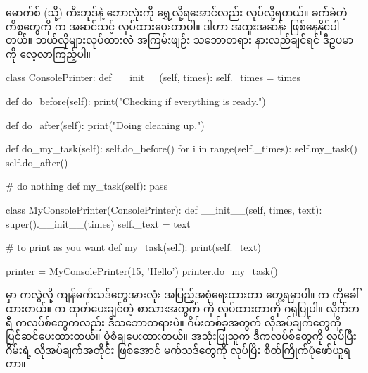 မောက်စ် (သို့) ကီးဘုဒ်နဲ့ ဘောလုံးကို ရွှေ့လို့ရအောင်လည်း လုပ်လို့ရတယ်။ ခက်ခဲတဲ့ ကိစ္စတွေကို  က အဆင်သင့် လုပ်ထားပေးတာပါ။ ဒါဟာ အထူးအဆန်း ဖြစ်နေနိုင်ပါတယ်။ ဘယ်လိုများလုပ်ထားလဲ အကြမ်းဖျဉ်း သဘောတရား နားလည်ချင်ရင် ဒီဥပမာကို လေ့လာကြည့်ပါ။ 
%
\begin{py}
class ConsolePrinter:
    def __init__(self, times):
        self._times = times
        
    def do_before(self):
        print("Checking if everything is ready.")
        
    def do_after(self):
        print("Doing cleaning up.")

    def do_my_task(self):
        self.do_before()
        for i in range(self._times):
            self.my_task()
        self.do_after()

    # do nothing    
    def my_task(self):
        pass


class MyConsolePrinter(ConsolePrinter):
    def __init__(self, times, text):
        super().__init__(times)
        self._text = text

    # to print as you want
    def my_task(self):
        print(self._text)


printer = MyConsolePrinter(15, 'Hello')
printer.do_my_task()
\end{py}
%
  မှာ  ကလွဲလို့ ကျန်မက်သဒ်တွေအားလုံး အပြည့်အစုံရေးထားတာ တွေ့ရမှာပါ။  က  ကိုခေါ်ထားတယ်။  က ထုတ်ပေးချင်တဲ့ စာသားအတွက်  ကို  လုပ်ထားတာကို ဂရုပြုပါ။  လိုက်ဘရီ ကလပ်စ်တွေကလည်း ဒီသဘောတရားပဲ။ ဂိမ်းတစ်ခုအတွက် လိုအပ်ချက်တွေကို ပြင်ဆင်ပေးထားတယ်။ ပုံစံချပေးထားတယ်။ အသုံးပြုသူက ဒီကလပ်စ်တွေကို  လုပ်ပြီး ဂိမ်းရဲ့ လိုအပ်ချက်အတိုင်း ဖြစ်အောင် မက်သဒ်တွေကို  လုပ်ပြီး စိတ်ကြိုက်ပုံဖော်ယူရတာ။


